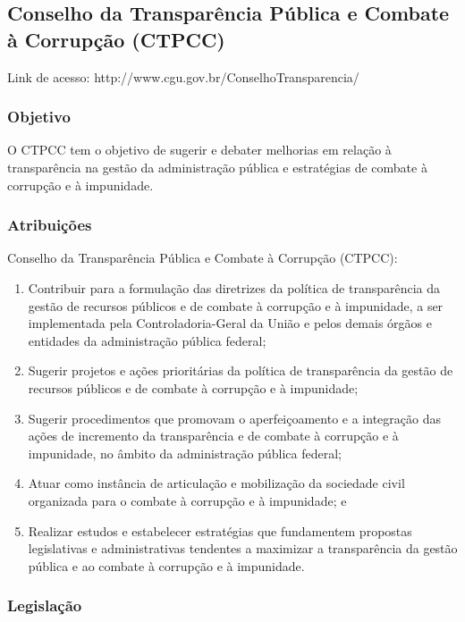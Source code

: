 \subsection*{Conselho da Transparência Pública e Combate à Corrupção (CTPCC)}

Link de acesso: http://www.cgu.gov.br/ConselhoTransparencia/

\subsubsection*{Objetivo}

O CTPCC tem o objetivo de sugerir e debater melhorias em relação
à transparência na gestão da administração pública e
estratégias de combate à corrupção e à impunidade.

\subsubsection*{Atribuições}

Conselho da Transparência Pública e Combate à Corrupção
(CTPCC):

\begin{enumerate}
\item 
Contribuir para a formulação das diretrizes da política de
transparência da gestão de recursos públicos e de combate à
corrupção e à impunidade, a ser implementada pela
Controladoria-Geral da União e pelos demais órgãos e entidades da
administração pública federal;
\item 
Sugerir projetos e ações prioritárias da política de
transparência da gestão de recursos públicos e de combate à
corrupção e à impunidade;
\item 
Sugerir procedimentos que promovam o aperfeiçoamento e a
integração das ações de incremento da transparência e de
combate à corrupção e à impunidade, no âmbito da
administração pública federal;
\item 
Atuar como instância de articulação e mobilização da
sociedade civil organizada para o combate à corrupção e à
impunidade; e
\item 
Realizar estudos e estabelecer estratégias que fundamentem propostas
legislativas e administrativas tendentes a maximizar a transparência
da gestão pública e ao combate à corrupção e à
impunidade.
\end{enumerate}

\subsubsection*{Legislação}

